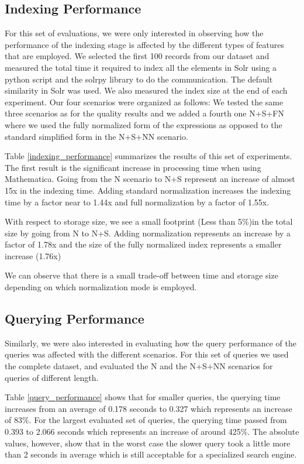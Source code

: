 \subsection{Indexing Performance}
For this set of evaluations, we were only interested in observing how the performance of the indexing stage is affected by the different types of features that are employed. We selected the first 100 records from our dataset and measured the total time it required to index all the elements in Solr using a python script and the solrpy library to do the communication. The default similarity in Solr was used. We also measured the index size at the end of each experiment.
Our four scenarios were organized as follows:
We tested the same three scenarios as for the quality results and we added a fourth one N+S+FN where we used the fully normalized form of the expressions as opposed to the standard simplified form in the N+S+NN scenario.

Table \ref{indexing_performance} summarizes the results of this set of experiments. The first result is the significant increase in processing time when using Mathematica. Going from the N scenario to N+S represent an increase of almost 15x in the indexing time. Adding standard normalization increases the indexing time by a factor near to 1.44x and full normalization by a factor of 1.55x.

With respect to storage size, we see a small footprint (Less than 5\%)in the total size by going from N to N+S. Adding normalization represents an increase by a factor of 1.78x and the size of the fully normalized index represents a smaller increase (1.76x)

We can observe that there is a small trade-off between time and storage size depending on which normalization mode is employed.



\subsection{Querying Performance}
Similarly, we were also interested in evaluating how the query performance of the queries was affected with the different scenarios. For this set of queries we used the complete dataset, and evaluated the N and the N+S+NN scenarios for queries of different length.


Table \ref{query_performance} shows that for smaller queries, the querying time increases from an average of 0.178 seconds to 0.327 which represents an increase of 83\%. For the largest evaluated set of queries, the querying time passed from 0.393 to 2.066 seconds which represents an increase of around 425\%. The absolute values, however, show that in the worst case the slower query took a little more than 2 seconds in average which is still acceptable for a specialized search engine.

